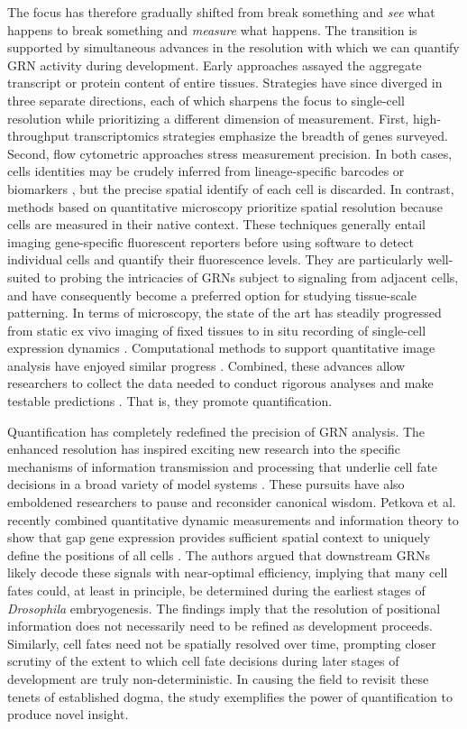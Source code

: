 The focus has therefore gradually shifted from break something and \textit{see} what happens to break something and \textit{measure} what happens. The transition is supported by simultaneous advances in the resolution with which we can quantify GRN activity during development. Early approaches assayed the aggregate transcript or protein content of entire tissues. Strategies have since diverged in three separate directions, each of which sharpens the focus to single-cell resolution while prioritizing a different dimension of measurement. First, high-throughput transcriptomics strategies emphasize the breadth of genes surveyed. Second, flow cytometric approaches stress measurement precision. In both cases, cells identities may be crudely inferred from lineage-specific barcodes or biomarkers \cite{Herring2018}, but the precise spatial identify of each cell is discarded. In contrast, methods based on quantitative microscopy prioritize spatial resolution because cells are measured in their native context. These techniques generally entail imaging gene-specific fluorescent reporters before using software to detect individual cells and quantify their fluorescence levels. They are particularly well-suited to probing the intricacies of GRNs subject to signaling from adjacent cells, and have consequently become a preferred option for studying tissue-scale patterning. In terms of microscopy, the state of the art has steadily progressed from static ex vivo imaging of fixed tissues to in situ recording of single-cell expression dynamics \cite{Keller2013}. Computational methods to support quantitative image analysis have enjoyed similar progress \cite{Sbalzarini2016}. Combined, these advances allow researchers to collect the data needed to conduct rigorous analyses and make testable predictions \cite{qbio2018}. That is, they promote quantification.

Quantification has completely redefined the precision of GRN analysis. The enhanced resolution has inspired exciting new research into the specific mechanisms of information transmission and processing that underlie cell fate decisions in a broad variety of model systems \cite{Pelaez2015a,Frick2017,Wolff2018,Petkova2019}. These pursuits have also emboldened researchers to pause and reconsider canonical wisdom. Petkova et al. recently combined quantitative dynamic measurements and information theory to show that gap gene expression provides sufficient spatial context to uniquely define the positions of all cells \cite{Petkova2019}. The authors argued that downstream GRNs likely decode these signals with near-optimal efficiency, implying that many cell fates could, at least in principle, be determined during the earliest stages of \emph{Drosophila} embryogenesis. The findings imply that the resolution of positional information does not necessarily need to be refined as development proceeds. Similarly, cell fates need not be spatially resolved over time, prompting closer scrutiny of the extent to which cell fate decisions during later stages of development are truly non-deterministic. In causing the field to revisit these tenets of established dogma, the study exemplifies the power of quantification to produce novel insight.

